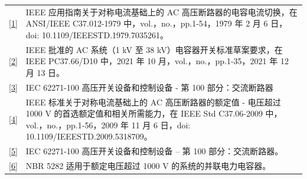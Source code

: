 \documentclass[a4paper]{article}
\begin{document}
	\noindent
	\begin{tabular}{p{0.2cm} p{15.8cm}}
		\href{https://ieeexplore.ieee.org/document/7035261}{[1]} &
		\begin{minipage}[t]{15.8cm}
			IEEE 应用指南关于对称电流基础上的 AC 高压断路器的电容电流切换，在 ANSI/IEEE C37.012-1979 中，vol.，no.，pp.1-54，1979 年 2 月 6 日，doi: 10.1109/IEEESTD.1979.7035261。
		\end{minipage} \\
		
		\href{https://ieeexplore.ieee.org/document/9574631}{[2]} &
		\begin{minipage}[t]{15.8cm}
			IEEE 批准的 AC 系统（1 kV 至 38 kV）电容器开关标准草案要求，在 IEEE PC37.66/D10 中，2021 年 10 月，vol.，no.，pp.1-35，2021 年 12 月 13 日。
		\end{minipage} \\
		
		
		\href{https://webstore.iec.ch/publication/62785}{[3]} &
		\begin{minipage}[t]{15.8cm}
			IEC 62271-100 高压开关设备和控制设备 - 第 100 部分：交流断路器
		\end{minipage} \\
		
		\href{https://ieeexplore.ieee.org/document/5318709}{[4]} &
		\begin{minipage}[t]{15.8cm}
			IEEE 标准关于对称电流基础上的 AC 高压断路器的额定值 - 电压超过 1000 V 的首选额定值和相关所需能力，在 IEEE Std C37.06-2009 中，vol.，no.，pp.1-56，2009 年 11 月 6 日，doi: 10.1109/IEEESTD.2009.5318709。
		\end{minipage} \\
		
		\href{https://cdn.standards.iteh.ai/samples/101972/4e7e06bd66d2443da668b8e0c6c60512/IEC-62271-100-2021.pdf}{[5]} &
		\begin{minipage}[t]{15.8cm}
			IEC 62271-100 高压开关设备和控制设备 – 第 100 部分：交流断路器。
		\end{minipage} \\
		
		\href{https://www.normas.com.br/autorizar/visualizacao-nbr/313/identificar/visitante}{[6]} &
		\begin{minipage}[t]{15.8cm}
			NBR 5282 适用于额定电压超过 1000 V 的系统的并联电力电容器。
		\end{minipage} \\
	\end{tabular}
	
\end{document}
